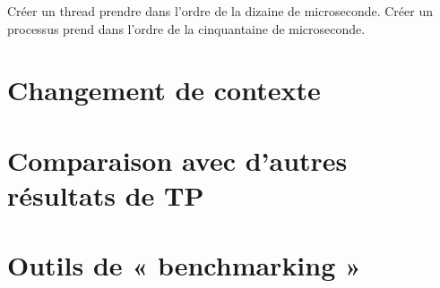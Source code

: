 \documentclass[12pt]{article}
\begin{document}
		Créer un thread prendre dans l'ordre de la dizaine de microseconde. \newline
		Créer un processus prend dans l'ordre de la cinquantaine de microseconde.\newline


\section{Changement de contexte}

\section{Comparaison avec d'autres résultats de TP}

\section{Outils de « benchmarking »}
\end{document}
